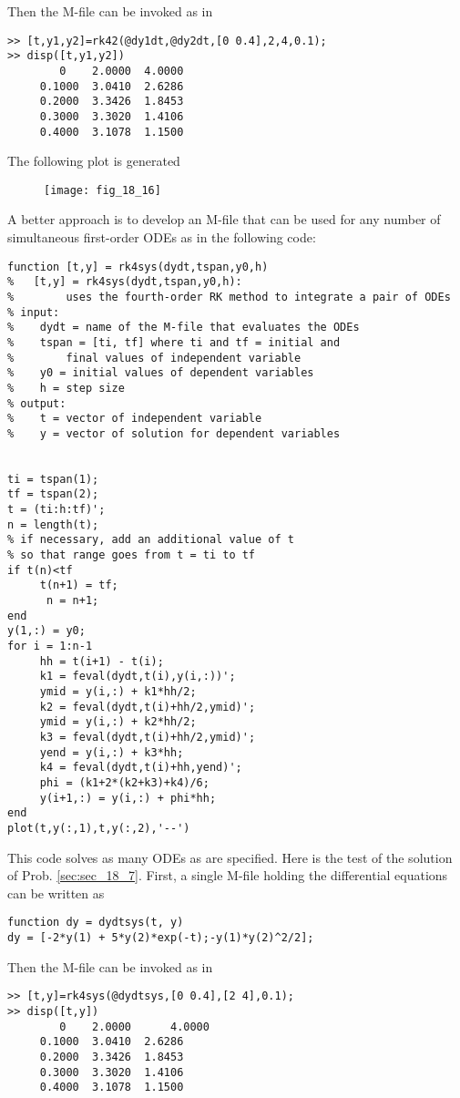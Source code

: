 \documentclass[../main.tex]{subfiles}
\begin{document}
	\bigbreak
Then the M-file can be invoked as in
	\bigbreak
\begin{lstlisting}[numbers=none]
>> [t,y1,y2]=rk42(@dy1dt,@dy2dt,[0 0.4],2,4,0.1);
>> disp([t,y1,y2])
 		0	 2.0000	 4.0000
	 0.1000	 3.0410	 2.6286
	 0.2000	 3.3426	 1.8453
	 0.3000	 3.3020	 1.4106
	 0.4000	 3.1078	 1.1500 
\end{lstlisting}
	\bigbreak
The following plot is generated 
	\bigbreak
	\begin{figure}[H]
		\texttt{[image: fig\_18\_16]}
		\label{fig:fig_18_16}
	\end{figure}
	\bigbreak
A better approach is to develop an M-file that can be used for any number of simultaneous
first-order ODEs as in the following code: 
	\bigbreak
\begin{lstlisting}[numbers=none]
function [t,y] = rk4sys(dydt,tspan,y0,h)
% 	[t,y] = rk4sys(dydt,tspan,y0,h):
%		 uses the fourth-order RK method to integrate a pair of ODEs
% input:
%	 dydt = name of the M-file that evaluates the ODEs
%	 tspan = [ti, tf] where ti and tf = initial and
%		 final values of independent variable
%	 y0 = initial values of dependent variables
%	 h = step size
% output:
%	 t = vector of independent variable
%	 y = vector of solution for dependent variables


ti = tspan(1);
tf = tspan(2);
t = (ti:h:tf)';
n = length(t);
% if necessary, add an additional value of t
% so that range goes from t = ti to tf
if t(n)<tf
	 t(n+1) = tf;
	  n = n+1;
end
y(1,:) = y0;
for i = 1:n-1
	 hh = t(i+1) - t(i);
	 k1 = feval(dydt,t(i),y(i,:))';
	 ymid = y(i,:) + k1*hh/2;
	 k2 = feval(dydt,t(i)+hh/2,ymid)';
	 ymid = y(i,:) + k2*hh/2;
	 k3 = feval(dydt,t(i)+hh/2,ymid)';
	 yend = y(i,:) + k3*hh;
	 k4 = feval(dydt,t(i)+hh,yend)';
	 phi = (k1+2*(k2+k3)+k4)/6;
	 y(i+1,:) = y(i,:) + phi*hh;
end
plot(t,y(:,1),t,y(:,2),'--')
\end{lstlisting}
	\bigbreak
This code solves as many ODEs as are specified. Here is the test of the solution of Prob. \ref{sec:sec_18_7}. First, a single M-file holding the differential equations can be written as 
	\bigbreak
\begin{lstlisting}[numbers=none]
function dy = dydtsys(t, y)
dy = [-2*y(1) + 5*y(2)*exp(-t);-y(1)*y(2)^2/2]; 
\end{lstlisting}
	\bigbreak
Then the M-file can be invoked as in
	\bigbreak
\begin{lstlisting}[numbers=none]
>> [t,y]=rk4sys(@dydtsys,[0 0.4],[2 4],0.1);
>> disp([t,y])
		0 	 2.0000 	 4.0000
	 0.1000	 3.0410	 2.6286
	 0.2000	 3.3426	 1.8453
	 0.3000	 3.3020	 1.4106
	 0.4000	 3.1078	 1.1500 
\end{lstlisting}
\end{document}
